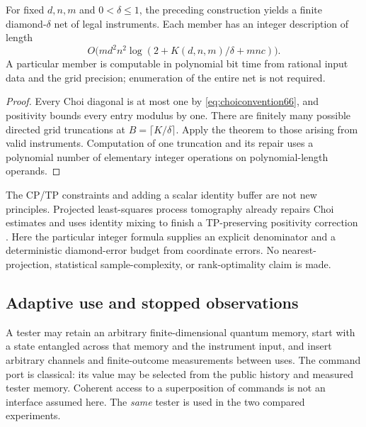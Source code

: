 \begin{corollary}\label{cor:instrumentnet66}
For fixed $d,n,m$ and $0<\delta\le1$, the preceding construction yields
a finite diamond-$\delta$ net of legal instruments. Each member has
an integer description of length
\[
 O\bigl(m d^2n^2\log(2+K(d,n,m)/\delta+mnc)\bigr).
\]
A particular member is computable in polynomial bit time from rational
input data and the grid precision; enumeration of the entire net is
not required.
\end{corollary}
\begin{proof}
Every Choi diagonal is at most one by \eqref{eq:choiconvention66}, and
positivity bounds every entry modulus by one. There are finitely many
possible directed grid truncations at $B=\lceil K/\delta\rceil$.
Apply the theorem to those arising from valid instruments. Computation
of one truncation and its repair uses a polynomial number of elementary
integer operations on polynomial-length operands.
\end{proof}
The CP/TP constraints and adding a scalar identity buffer are not new
principles. Projected least-squares process tomography already repairs
Choi estimates and uses identity mixing to finish a TP-preserving
positivity correction \cite[Section~4]{PLS66}. Here the particular
integer formula supplies an explicit denominator and a deterministic
diamond-error budget from coordinate errors. No nearest-projection,
statistical sample-complexity, or rank-optimality claim is made.

\subsection{Adaptive use and stopped observations}
A tester may retain an arbitrary finite-dimensional quantum memory,
start with a state entangled across that memory and the instrument
input, and insert arbitrary channels and finite-outcome measurements between uses.
The command port is classical: its value may be selected from the
public history and measured tester memory. Coherent access to a
superposition of commands is not an interface assumed here. The
\emph{same} tester is used in the two compared experiments.

